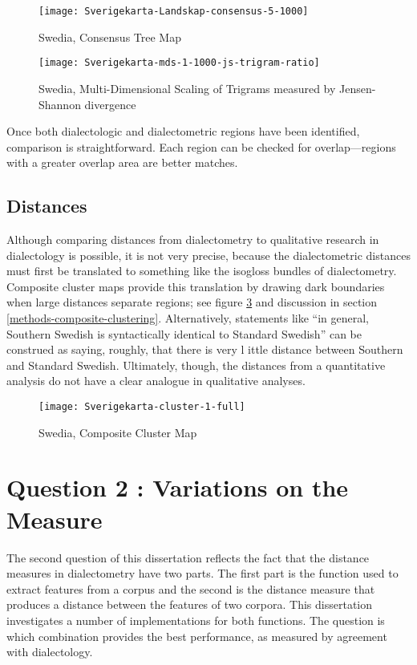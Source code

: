 \begin{figure}
  \texttt{[image: Sverigekarta-Landskap-consensus-5-1000]}
 \caption{Swedia, Consensus Tree Map}
  \label{consensus-example-small}
\end{figure}

\begin{figure}
  \texttt{[image: Sverigekarta-mds-1-1000-js-trigram-ratio]}
 \caption{Swedia, Multi-Dimensional Scaling of Trigrams measured by
    Jensen-Shannon divergence}
  \label{mds-example-small}
\end{figure}

Once both dialectologic and dialectometric regions have been
identified, comparison is straightforward. Each region can be checked
for overlap---regions with a greater overlap area are better matches.

\subsection{Distances}

Although comparing distances from dialectometry to qualitative
research in dialectology is possible, it is not very precise, because
the dialectometric distances must first be translated to something
like the isogloss bundles of dialectometry. Composite cluster maps
provide this translation by drawing dark boundaries when large
distances separate regions; see figure
\ref{composite-example-small} and discussion in section
\ref{methods-composite-clustering}. Alternatively, statements like ``in
general, Southern Swedish is syntactically identical to Standard
Swedish'' \cite{rosenkvist07} can be construed as saying, roughly,
that there is very l ittle distance between Southern and Standard
Swedish. Ultimately, though, the distances from a quantitative
analysis do not have a clear analogue in qualitative analyses.

\begin{figure}
  \texttt{[image: Sverigekarta-cluster-1-full]}
 \caption{Swedia, Composite Cluster Map}
  \label{composite-example-small}
\end{figure}


\section{Question 2 : Variations on the Measure}

The second question of this dissertation reflects the fact that the
distance measures in dialectometry have two
parts. The first part is the function used to extract features from a
corpus and the second is the distance measure that produces a distance
between the features of two corpora. This dissertation investigates a
number of implementations for both functions. The question is which
combination provides the best performance, as measured by agreement
with dialectology.

